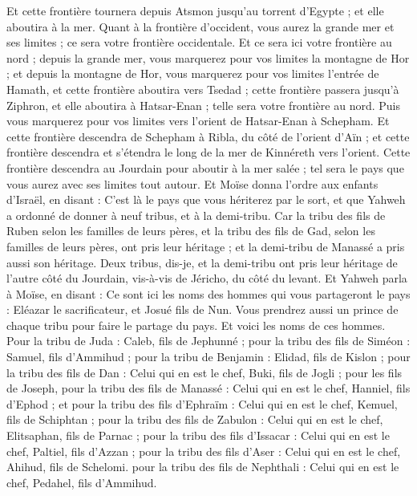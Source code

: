 \begin{multicols}{2}
Et cette frontière tournera depuis Atsmon jusqu'au torrent d'Egypte ; et elle aboutira à la mer.
Quant à la frontière d'occident, vous aurez la grande mer et ses limites ; ce sera votre frontière occidentale.
Et ce sera ici votre frontière au nord ; depuis la grande mer, vous marquerez pour vos limites la montagne de Hor ;
et depuis la montagne de Hor, vous marquerez pour vos limites l’entrée de Hamath, et cette frontière aboutira vers Tsedad ;
cette frontière passera jusqu’à Ziphron, et elle aboutira à Hatsar-Enan ; telle sera votre frontière au nord.
Puis vous marquerez pour vos limites vers l'orient de Hatsar-Enan à Schepham.
Et cette frontière descendra de Schepham à Ribla, du côté de l'orient d'Aïn ; et cette frontière descendra et s'étendra le long de la mer de Kinnéreth vers l'orient.
Cette frontière descendra au Jourdain pour aboutir à la mer salée ; tel sera le pays que vous aurez avec ses limites tout autour.
Et Moïse donna l'ordre aux enfants d'Israël, en disant : C'est là le pays que vous hériterez par le sort, et que Yahweh a ordonné de donner à neuf tribus, et à la demi-tribu.
Car la tribu des fils de Ruben selon les familles de leurs pères, et la tribu des fils de Gad, selon les familles de leurs pères, ont pris leur héritage ; et la demi-tribu de Manassé a pris aussi son héritage.
Deux tribus, dis-je, et la demi-tribu ont pris leur héritage de l'autre côté du Jourdain, vis-à-vis de Jéricho, du côté du levant.
Et Yahweh parla à Moïse, en disant :
Ce sont ici les noms des hommes qui vous partageront le pays : Eléazar le sacrificateur, et Josué fils de Nun.
Vous prendrez aussi un prince de chaque tribu pour faire le partage du pays.
Et voici les noms de ces hommes. Pour la tribu de Juda : Caleb, fils de Jephunné ;
pour la tribu des fils de Siméon : Samuel, fils d'Ammihud ;
pour la tribu de Benjamin : Elidad, fils de Kislon ;
pour la tribu des fils de Dan : Celui qui en est le chef, Buki, fils de Jogli ;
pour les fils de Joseph, pour la tribu des fils de Manassé : Celui qui en est le chef, Hanniel, fils d'Ephod ;
et pour la tribu des fils d'Ephraïm : Celui qui en est le chef, Kemuel, fils de Schiphtan ;
pour la tribu des fils de Zabulon : Celui qui en est le chef, Elitsaphan, fils de Parnac ;
pour la tribu des fils d'Issacar : Celui qui en est le chef, Paltiel, fils d'Azzan ;
pour la tribu des fils d'Aser : Celui qui en est le chef, Ahihud, fils de Schelomi.
pour la tribu des fils de Nephthali : Celui qui en est le chef, Pedahel, fils d'Ammihud.

\end{multicols}
